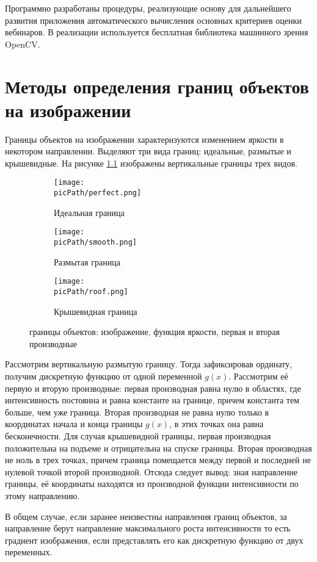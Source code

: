 \documentclass[oneside,final,14pt]{extreport}
\newcommand{\picPath}{pictures}
\begin{document}
Программно разработаны процедуры, реализующие основу для дальнейшего развития приложения автоматического вычисления основных критериев оценки вебинаров. В реализации используется бесплатная библиотека машинного зрения OpenCV. 

\chapter{Методы определения границ объектов на изображении}
Границы объектов на изображении характеризуются изменением яркости в некотором направлении. Выделяют три вида границ: идеальные,  размытые  и крышевидные. На рисунке \ref{fig:contours}  изображены вертикальные границы трех видов.

\begin{figure}[H]
  \centering
  \begin{subfigure}[b]{0.4\linewidth}
    \texttt{[image: \\picPath/perfect.png]}
    \caption{ Идеальная граница}
  \end{subfigure}
  \begin{subfigure}[b]{0.4\linewidth}
    \texttt{[image: \\picPath/smooth.png]}
    \caption{Размытая граница}
  \end{subfigure}
  \begin{subfigure}[b]{0.4\linewidth}
    \texttt{[image: \\picPath/roof.png]}
    \caption{Крышевидная граница}
  \end{subfigure}
  \caption{границы объектов: изображение, функция яркости, первая и вторая производные}
  \label{fig:contours}
\end{figure}

Рассмотрим вертикальную размытую границу. Тогда зафиксировав ординату, получим дискретную функцию от одной переменной $g(x)$. Рассмотрим её первую и вторую производные: первая производная равна нулю в областях, где интенсивность постоянна и равна константе на границе, причем константа тем больше, чем уже граница. Вторая производная не равна нулю только в координатах начала и конца границы $g(x)$, в этих точках она равна бесконечности. Для случая крышевидной границы, первая производная положительна на подъеме и отрицательна на спуске границы. Вторая производная не ноль в трех точках, причем граница помещается между первой и последней не нулевой точкой второй производной. Отсюда следует вывод: зная направление границы, её координаты находятся из производной функции интенсивности по этому направлению. 
 
В общем случае, если заранее неизвестны направления границ объектов, за направление берут направление максимального роста интенсивности  то есть градиент изображения, если представлять его как дискретную функцию от двух переменных. 
\end{document}
